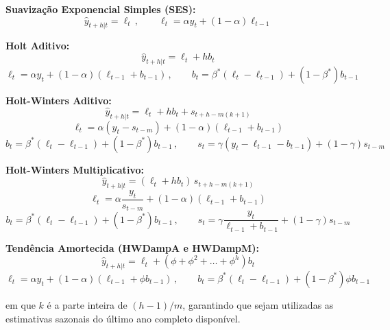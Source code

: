 \documentclass[12pt, a4paper]{article}
\begin{document}
\textbf{Suavização Exponencial Simples (SES):}
\begin{equation}
  \hat{y}_{t+h|t}=\ell_t\,, \qquad \ell_t=\alpha y_t+(1-\alpha)\ell_{t-1}
\end{equation}

\textbf{Holt Aditivo:}
\begin{equation}
  \hat{y}_{t+h|t}=\ell_t+hb_t
\end{equation}
\begin{equation}
  \ell_t=\alpha y_t+(1-\alpha)(\ell_{t-1}+b_{t-1})\,, \qquad b_t=\beta^{*}(\ell_t-\ell_{t-1})+(1-\beta^{*})b_{t-1}
\end{equation}

\textbf{Holt-Winters Aditivo:}
\begin{equation}
  \hat{y}_{t+h|t}=\ell_t+hb_t+s_{t+h-m(k+1)}
\end{equation}
\begin{equation}
  \ell_t=\alpha(y_t-s_{t-m})+(1-\alpha)(\ell_{t-1}+b_{t-1})
\end{equation}
\begin{equation}
  b_t=\beta^{*}(\ell_t-\ell_{t-1})+(1-\beta^{*})b_{t-1}\,, \qquad s_t=\gamma(y_t-\ell_{t-1}-b_{t-1})+(1-\gamma)s_{t-m}
\end{equation}

\textbf{Holt-Winters Multiplicativo:}
\begin{equation}
  \hat{y}_{t+h|t}=(\ell_t+hb_t)\,s_{t+h-m(k+1)}
\end{equation}
\begin{equation}
  \ell_t=\alpha\dfrac{y_t}{s_{t-m}}+(1-\alpha)(\ell_{t-1}+b_{t-1})
\end{equation}
\begin{equation}
  b_t=\beta^{*}(\ell_t-\ell_{t-1})+(1-\beta^{*})b_{t-1}\,, \qquad s_t=\gamma\dfrac{y_t}{\ell_{t-1}+b_{t-1}}+(1-\gamma)s_{t-m}
\end{equation}

\textbf{Tendência Amortecida (HWDampA e HWDampM):}
\begin{equation}
  \hat{y}_{t+h|t}=\ell_t+(\phi+\phi^2+\dots+\phi^h)b_t
\end{equation}
\begin{equation}
  \ell_t=\alpha y_t+(1-\alpha)(\ell_{t-1}+\phi b_{t-1})\,, \qquad b_t=\beta^{*}(\ell_t-\ell_{t-1})+(1-\beta^{*})\phi b_{t-1}
\end{equation}

em que $k$ é a parte inteira de $(h-1)/m$, garantindo que sejam utilizadas as estimativas sazonais do último ano completo disponível.
\end{document}
